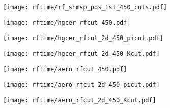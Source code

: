 \documentclass[aspectratio=169,xcolor=dvipsnames]{beamer}
\begin{document}
\begin{frame}
  \texttt{[image: rftime/rf\_shmsp\_pos\_1st\_450\_cuts.pdf]}
\end{frame}
\begin{frame}
  \texttt{[image: rftime/hgcer\_rfcut\_450.pdf]}
\end{frame}
\begin{frame}
  \texttt{[image: rftime/hgcer\_rfcut\_2d\_450\_picut.pdf]}
\end{frame}
\begin{frame}
  \texttt{[image: rftime/hgcer\_rfcut\_2d\_450\_Kcut.pdf]}
\end{frame}
\begin{frame}
  \texttt{[image: rftime/aero\_rfcut\_450.pdf]}
\end{frame}
\begin{frame}
  \texttt{[image: rftime/aero\_rfcut\_2d\_450\_picut.pdf]}
\end{frame}
\begin{frame}
  \texttt{[image: rftime/aero\_rfcut\_2d\_450\_Kcut.pdf]}
\end{frame}
\begin{frame}
\end{frame}
\begin{frame}
\end{frame}



    
\end{document}

